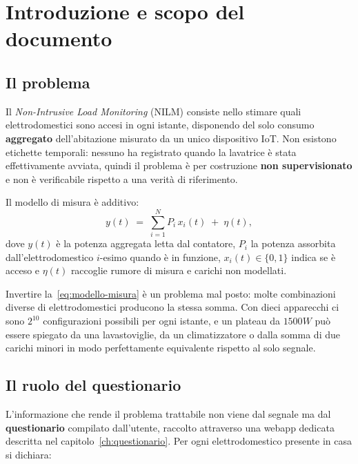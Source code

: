 \chapter{Introduzione e scopo del documento}

\section{Il problema}

Il \emph{Non-Intrusive Load Monitoring} (NILM) consiste nello stimare quali elettrodomestici
sono accesi in ogni istante, disponendo del solo consumo \textbf{aggregato} dell'abitazione
misurato da un unico dispositivo IoT. Non esistono etichette temporali: nessuno ha registrato
quando la lavatrice è stata effettivamente avviata, quindi il problema è per costruzione
\textbf{non supervisionato} e non è verificabile rispetto a una verità di riferimento.

Il modello di misura è additivo:
\begin{equation}
  y(t) \;=\; \sum_{i=1}^{N} P_i \, x_i(t) \;+\; \eta(t),
  \label{eq:modello-misura}
\end{equation}
dove $y(t)$ è la potenza aggregata letta dal contatore, $P_i$ la potenza assorbita
dall'elettrodomestico $i$-esimo quando è in funzione, $x_i(t) \in \{0,1\}$ indica se è acceso e
$\eta(t)$ raccoglie rumore di misura e carichi non modellati.

Invertire la~\eqref{eq:modello-misura} è un problema mal posto: molte combinazioni diverse di
elettrodomestici producono la stessa somma. Con dieci apparecchi ci sono $2^{10}$ configurazioni
possibili per ogni istante, e un plateau da $1500\unit{W}$ può essere spiegato da una
lavastoviglie, da un climatizzatore o dalla somma di due carichi minori in modo perfettamente
equivalente rispetto al solo segnale.

\section{Il ruolo del questionario}

L'informazione che rende il problema trattabile non viene dal segnale ma dal
\textbf{questionario} compilato dall'utente, raccolto attraverso una webapp dedicata descritta nel
capitolo~\ref{ch:questionario}. Per ogni elettrodomestico presente in casa si dichiara:

